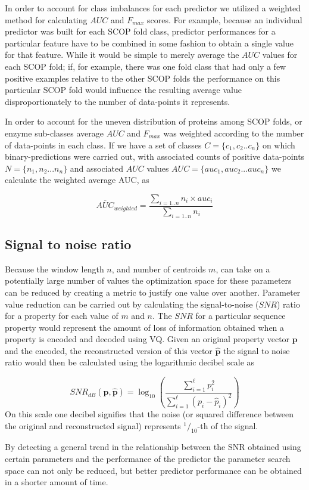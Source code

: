 In order to account for class imbalances for each predictor we utilized a weighted method for calculating $AUC$ and $F_{max}$ scores. For example, because an individual predictor was built for each SCOP fold class, predictor performances for a particular feature have to be combined in some fashion to obtain a single value for that feature. While it would be simple to merely average the $AUC$ values for each SCOP fold; if, for example, there was one fold class that had only a few positive examples relative to the other SCOP folds the performance on this particular SCOP fold would influence the resulting average value disproportionately to the number of data-points it represents.

In order to account for the uneven distribution of proteins among SCOP folds, or enzyme sub-classes average $AUC$ and $F_{max}$ was weighted according to the number of data-points in each class. If we have a set of classes $C=\{c_{1},c_{2}..c_{n}\}$ on which binary-predictions were carried out, with associated counts of positive data-points $N=\{n_{1},n_{2}...n_{n}\}$ and associated $AUC$ values $AUC=\{auc_{1},auc_{2}...auc_{n}\}$ we calculate the weighted average AUC, as 

\[
\overline{AUC}_{weighted}=\frac{\underset{i=1..n}{\sum}n_{i}\times auc_{i}}{\underset{i=1..n}{\sum}n_{i}}
\]


\subsection{Signal to noise ratio}

Because the window length $n$, and number of centroids $m$, can take on a potentially large number of values the optimization space for these parameters can be reduced by creating a metric to justify one value over another. Parameter value reduction can be carried out by calculating the signal-to-noise ($SNR$) ratio for a property for each value of $m$ and $n$. The $SNR$ for a particular sequence property would represent the amount of loss of information obtained when a property is encoded and decoded using VQ. Given an original property vector $\mathbf{p}$ and the encoded, the reconstructed version of this vector $\hat{\mathbf{p}}$ the signal to noise ratio would then be calculated using the logarithmic decibel scale as 

\[
SNR_{dB}(\mathbf{p},\hat{\mathbf{p}})=\log_{10}\left(\frac{\sum\limits _{i=1}^{\ell}p_{i}^{2}}{\sum\limits _{i=1}^{\ell}(p_{i}-\hat{p}_{i})^{2}}\right)
\]
On this scale one decibel signifies that the noise (or squared difference between the original and reconstructed signal) represents $^{1}/_{10}$-th
of the signal.

By detecting a general trend in the relationship between the SNR obtained using certain parameters and the performance of the predictor the parameter search space can not only be reduced, but better predictor performance can be obtained in a shorter amount of time.
